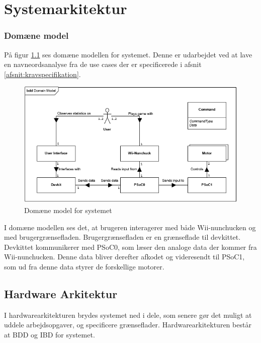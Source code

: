 \chapter{Systemarkitektur}

\subsection{Domæne model}
På figur \ref{fig:DomainModel} ses domæne modellen for systemet. Denne er udarbejdet ved at lave en navneordsanalyse fra de use cases der er specificerede i afsnit \ref{afsnit:kravspecifikation}.

\begin{figure}[H]
	\centering
	\includegraphics[width=\textwidth]{Systemarkitektur/images/DomainModel}
	\caption{Domæne model for systemet}
	\label{fig:DomainModel}
\end{figure}

I domæne modellen ses det, at brugeren interagerer med både Wii-nunchucken og med brugergrænsefladen. Brugergrænsefladen er en grænseflade til devkittet. Devkittet kommunikerer med PSoC0, som læser den analoge data der kommer fra Wii-nunchucken. Denne data bliver derefter afkodet og videresendt til PSoC1, som ud fra denne data styrer de forskellige motorer.

\section{Hardware Arkitektur}
I hardwarearkitekturen brydes systemet ned i dele, som senere gør det muligt at uddele arbejdsopgaver, og specificere grænseflader. Hardwarearkitekturen består at BDD og IBD for systemet.

